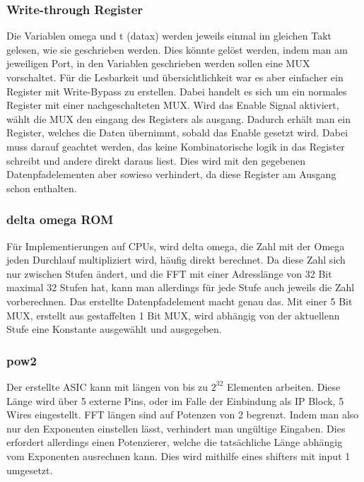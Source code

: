 \documentclass[fontsize=12pt,paper=a4,ngerman]{scrarticle}
\begin{document}
\subsubsection{Write-through Register}
Die Variablen omega und t (datax) werden jeweils einmal im gleichen Takt
gelesen, wie sie geschrieben werden. Dies könnte gelöst werden, indem man am
jeweiligen Port, in den Variablen geschrieben werden sollen eine MUX
vorschaltet. Für die Lesbarkeit und übersichtlichkeit war es aber einfacher ein
Register mit Write-Bypass zu erstellen. Dabei handelt es sich um ein normales
Register mit einer nachgeschalteten MUX. Wird das Enable Signal aktiviert,
wählt die MUX den eingang des Registers als ausgang. Dadurch erhält man ein
Register, welches die Daten übernimmt, sobald das Enable gesetzt wird. Dabei
muss darauf geachtet werden, das keine Kombinatorische logik in das Register
schreibt und andere direkt daraus liest. Dies wird mit den gegebenen
Datenpfadelementen aber sowieso verhindert, da diese Register am Ausgang schon
enthalten. %

\subsubsection{delta omega ROM}
Für Implementierungen auf CPUs, wird delta omega, die Zahl mit der Omega jeden
Durchlauf multipliziert wird, häufig direkt berechnet. Da diese Zahl sich nur
zwischen Stufen ändert, und die FFT mit einer Adresslänge von 32 Bit maximal 32
Stufen hat, kann man allerdings für jede Stufe auch jeweils die Zahl
vorberechnen. Das erstellte Datenpfadelement macht genau das. Mit einer 5 Bit
MUX, erstellt aus gestaffelten 1 Bit MUX, wird abhängig von der aktuellenn
Stufe eine Konstante ausgewählt und ausgegeben.

\subsubsection{pow2}
Der erstellte ASIC kann mit längen von bis zu $2^32$ Elementen arbeiten. Diese
Länge wird über 5 externe Pins, oder im Falle der Einbindung als IP Block, 5
Wires eingestellt. FFT längen sind auf Potenzen von 2 begrenzt. Indem man also
nur den Exponenten einstellen lässt, verhindert man ungültige Eingaben. Dies
erfordert allerdings einen Potenzierer, welche die tatsächliche Länge abhängig
vom Exponenten ausrechnen kann. Dies wird mithilfe eines shifters mit input 1
umgesetzt.
\end{document}
